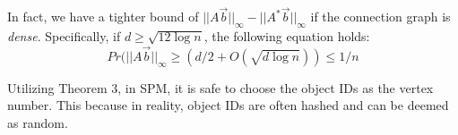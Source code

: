 In fact, we have a tighter bound of $||A\vec{b}||_\infty -||A^*\vec{b}||_\infty$ if 
the connection graph is \emph{dense}. Specifically, if $d\geq \sqrt{12\log n}$, the following
equation holds:
\begin{equation*}
Pr(||A\vec{b}||_\infty \geq (d/2 + O(\sqrt{d\log n})) \leq 1/n
\end{equation*}

Utilizing Theorem 3, in SPM, it is safe to choose the object IDs as 
the vertex number. This because in reality, object IDs are often 
hashed and can be deemed as random.
